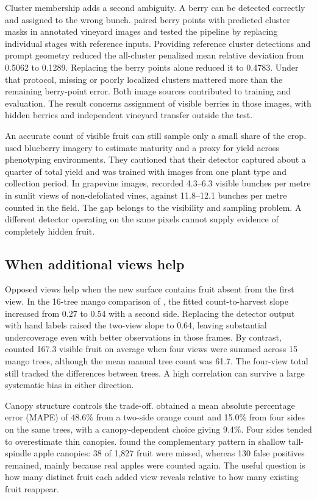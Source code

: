 Cluster membership adds a second ambiguity. A berry can be detected correctly and assigned to the wrong bunch. \citet{xie2026unified} paired berry points with predicted cluster masks in annotated vineyard images and tested the pipeline by replacing individual stages with reference inputs. Providing reference cluster detections and prompt geometry reduced the all-cluster penalized mean relative deviation from 0.5062 to 0.1289. Replacing the berry points alone reduced it to 0.4783. Under that protocol, missing or poorly localized clusters mattered more than the remaining berry-point error. Both image sources contributed to training and evaluation. The result concerns assignment of visible berries in those images, with hidden berries and independent vineyard transfer outside the test.

An accurate count of visible fruit can still sample only a small share of the crop. \citet{zhang2024open} used blueberry imagery to estimate maturity and a proxy for yield across phenotyping environments. They cautioned that their detector captured about a quarter of total yield and was trained with images from one plant type and collection period. In grapevine images, \citet{victorino2020yield} recorded 4.3--6.3 visible bunches per metre in sunlit views of non-defoliated vines, against 11.8--12.1 bunches per metre counted in the field. The gap belongs to the visibility and sampling problem. A different detector operating on the same pixels cannot supply evidence of completely hidden fruit.

\subsection{When additional views help}\label{sec:repeat-views}

Opposed views help when the new surface contains fruit absent from the first view. In the 16-tree mango comparison of \citet{stein2016image}, the fitted count-to-harvest slope increased from 0.27 to 0.54 with a second side. Replacing the detector output with hand labels raised the two-view slope to 0.64, leaving substantial undercoverage even with better observations in those frames. By contrast, \citet{payne2013estimation} counted 167.3 visible fruit on average when four views were summed across 15 mango trees, although the mean manual tree count was 61.7. The four-view total still tracked the differences between trees. A high correlation can survive a large systematic bias in either direction.

Canopy structure controls the trade-off. \citet{mirhaji2021fruit} obtained a mean absolute percentage error (MAPE) of 48.6\% from a two-side orange count and 15.0\% from four sides on the same trees, with a canopy-dependent choice giving 9.4\%. Four sides tended to overestimate thin canopies. \citet{silwal2016hierarchical} found the complementary pattern in shallow tall-spindle apple canopies: 38 of 1{,}827 fruit were missed, whereas 130 false positives remained, mainly because real apples were counted again. The useful question is how many distinct fruit each added view reveals relative to how many existing fruit reappear.

